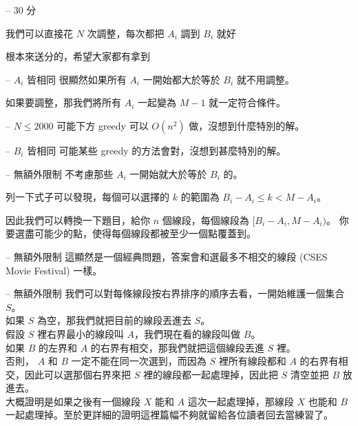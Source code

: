 \documentclass[hyperref,UTF8,notheorems,xcolor={dvipsnames}]{beamer}
\newcommand{\btitle}[1]{{\secname} -- #1}
\theoremstyle{definition}
\begin{document}
\begin{frame}[fragile]{\btitle{30 分}}
	
	我們可以直接花 $N$ 次調整，每次都把 $A_i$ 調到 $B_i$ 就好
	\pause

	根本來送分的，希望大家都有拿到
	
\end{frame}

\begin{frame}[fragile]{\btitle{$A_i$ 皆相同}}
	很顯然如果所有 $A_i$ 一開始都大於等於 $B_i$ 就不用調整。
	\pause

	如果要調整，那我們將所有 $A_i$ 一起變為 $M - 1$ 就一定符合條件。
\end{frame}

\begin{frame}[fragile]{\btitle{$N \le 2000$}}
	可能下方 greedy 可以 $O(n^2)$ 做，沒想到什麼特別的解。

\end{frame}

\begin{frame}[fragile]{\btitle{$B_i$ 皆相同}}
	可能某些 greedy 的方法會對，沒想到甚麼特別的解。
	
\end{frame}

\begin{frame}[fragile]{\btitle{無額外限制}}
	不考慮那些 $A_i$ 一開始就大於等於 $B_i$ 的。

	列一下式子可以發現，每個可以選擇的 $k$ 的範圍為 $B_i - A_i \le k < M - A_i$。 
	\pause 

	因此我們可以轉換一下題目，給你 $n$ 個線段，每個線段為 $[B_i - A_i, M - A_i)$。
	你要選盡可能少的點，使得每個線段都被至少一個點覆蓋到。
\end{frame}

\begin{frame}[fragile]{\btitle{無額外限制}}
	這顯然是一個經典問題，答案會和選最多不相交的線段 (CSES Movie Festival) 一樣。 
\end{frame}

\begin{frame}[fragile]{\btitle{無額外限制}}
	我們可以對每條線段按右界排序的順序去看，一開始維護一個集合 $S$。  \\
	如果 $S$ 為空，那我們就把目前的線段丟進去 $S$。  \\ \pause
	假設 $S$ 裡右界最小的線段叫 $A$，我們現在看的線段叫做 $B$。  \\ 
	如果 $B$ 的左界和 $A$ 的右界有相交，那我們就把這個線段丟進 $S$ 裡。  \\ \pause
	否則， $A$ 和 $B$ 一定不能在同一次選到，而因為 $S$ 裡所有線段都和 $A$ 的右界有相交，因此可以選那個右界來把 $S$ 裡的線段都一起處理掉，因此把 $S$ 清空並把 $B$ 放進去。  \\ 
	大概證明是如果之後有一個線段 $X$ 能和 $A$ 這次一起處理掉，那線段 $X$ 也能和 $B$ 一起處理掉。至於更詳細的證明這裡篇幅不夠就留給各位讀者回去當練習了。
\end{frame}
\end{document}
